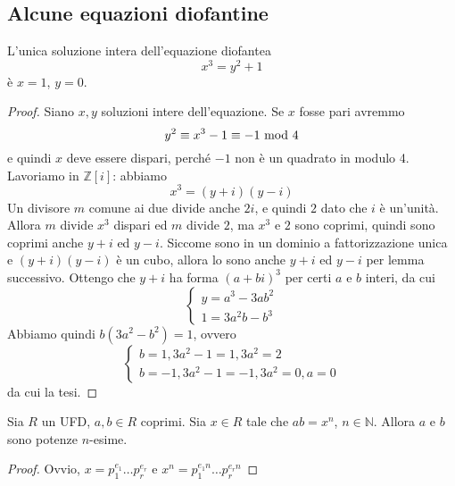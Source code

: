 \subsection{Alcune equazioni diofantine}
\begin{teorema}
	L'unica soluzione intera dell'equazione diofantea
	\begin{equation*}
	x^3=y^2+1
	\end{equation*}
	è $x=1$, $y=0$.
\end{teorema}
\begin{proof}
	Siano $x,y$ soluzioni intere dell'equazione. Se $x$ fosse pari avremmo 
	\begin{equation*}
	y^2\equiv x^3-1\equiv -1 \ \mathrm{mod}\ 4
	\end{equation*}
	 e quindi $x$ deve essere dispari, perché $-1$ non è un quadrato in modulo 4. Lavoriamo in $\mathbb{Z}[i]$: abbiamo 
	 \begin{equation*}
	 x^3=(y+i)(y-i)
	 \end{equation*}
	 Un divisore $m$ comune ai due divide anche $2i$, e quindi $2$ dato che $i$ è un'unità. Allora $m$ divide $x^3$ dispari ed $m$ divide $2$, ma $x^3$ e $2$ sono coprimi, quindi sono coprimi anche $y+i$ ed $y-i$. Siccome sono in un dominio a fattorizzazione unica e $(y+i)(y-i)$ è un cubo, allora lo sono anche $y+i$ ed $y-i$ per lemma successivo. Ottengo che $y+i$ ha forma $(a+bi)^3$ per certi $a$ e $b$ interi, da cui 
	 \begin{equation*}
	 \begin{cases}
	 y=a^3-3ab^2\\1=3a^2b-b^3
	 \end{cases}
	 \end{equation*}
	 Abbiamo quindi $b(3a^2-b^2)=1$, ovvero 
	 \begin{equation*}
	 \begin{cases}
	 b=1, 3a^2-1=1, 3a^2=2\\
	 b=-1, 3a^2-1=-1, 3a^2=0, a=0
	 \end{cases}
	 \end{equation*}
	 da cui la tesi.
\end{proof}
\begin{teorema}
	Sia $R$ un UFD, $a,b\in R$ coprimi. Sia $x\in R$ tale che $ab=x^n$, $n\in\mathbb{N}$. Allora $a$ e $b$ sono potenze $n$-esime.
\end{teorema}
\begin{proof}
	Ovvio, $x=p_1^{e_1}\dots p_r^{e_r}$ e $x^n=p_1^{e_1n}\dots p_r^{e_rn}$
\end{proof}
